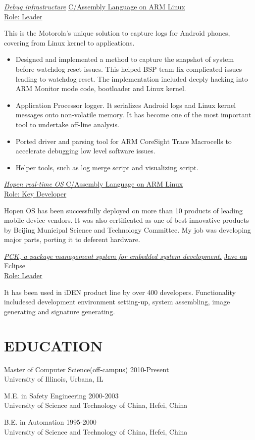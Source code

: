 \documentclass{res}
\begin{document}
\begin{resume}
\uline{{\sl Debug infrastructure}} \hfill \uline{C/Assembly Language on ARM Linux} \\
\uline{Role: Leader}

This is the Motorola's unique solution to capture logs for Android phones, covering from Linux kernel to applications.

	\begin{itemize}
	\item Designed and implemented a method to capture the snapshot of system before watchdog reset issues. This helped BSP team fix complicated issues leading to watchdog reset. The implementation included deeply hacking into ARM Monitor mode code, bootloader and Linux kernel.
	\item Application Processor logger. It serializes Android logs and Linux kernel messages onto non-volatile memory. It has become one of the most important tool to undertake off-line analysis.
	\item Ported driver and parsing tool for ARM CoreSight Trace Macrocells to accelerate debugging low level software issues.
	\item Helper tools, such as log merge script and visualizing script.
	\end{itemize}

\uline{{\sl Hopen real-time OS }} \hfill \uline{C/Assembly Language on ARM Linux}\\
\uline{Role: Key Developer}

Hopen OS has been successfully deployed on more than 10 products of leading mobile device vendors. It was also certificated as one of best innovative products by Beijing Municipal Science and Technology Committee. My job was developing major parts, porting it to deferent hardware.

\uline{{\sl PCK, a package management system for embedded system development.}} \hfill \uline{Jave on Eclipse}\\
\uline{Role: Leader}

It has been used in iDEN product line by over 400 developers. Functionality includesed development environment setting-up, system assembling, image generating and signature generating.
 
 
\section{EDUCATION} {\sl}
\vspace{0.1in}
                Master of Computer Science(off-campus) \hfill 2010-Present\\
                University of Illinois, Urbana, IL

                M.E. in Safety Engineering \hfill 2000-2003\\
                University of Science and Technology of China, Hefei, China

                B.E. in Automation \hfill 1995-2000\\
                University of Science and Technology of China, Hefei, China
 

\end{resume}
\end{document}
